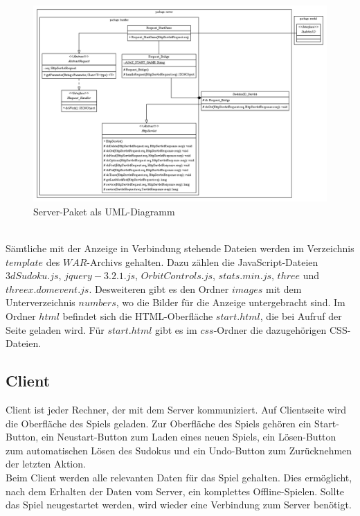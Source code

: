 \documentclass[a4paper,12pt]{scrreprt}
\begin{document}
	\begin{figure}
		\includegraphics[scale=0.55]{pictures/controller}
		\caption{Server-Paket als UML-Diagramm}
	\end{figure}\smallskip \\
	S\"amtliche mit der Anzeige in Verbindung stehende Dateien werden im Verzeichnis $template$ des
	$WAR$-Archivs gehalten. Dazu z\"ahlen die JavaScript-Dateien $3dSudoku.js$, $jquery-3.2.1.js$,
	$OrbitControls.js$, $stats.min.js$, $three$ und $threex.domevent.js$. Desweiteren gibt es den Ordner
	$images$ mit dem Unterverzeichnis $numbers$, wo die Bilder f\"ur die Anzeige untergebracht sind.
	Im Ordner $html$ befindet sich die HTML-Oberfl\"ache $start.html$, die bei Aufruf der Seite geladen wird.
	F\"ur $start.html$ gibt es im $css$-Ordner die dazugeh\"origen CSS-Dateien.\medskip \\

	\subsection{Client}
	Client ist jeder Rechner, der mit dem Server kommuniziert. Auf Clientseite wird die Oberfl\"ache des
	Spiels geladen. Zur Oberfl\"ache des Spiels geh\"oren ein Start-Button, ein Neustart-Button zum
	Laden eines neuen Spiels, ein L\"osen-Button zum automatischen L\"osen des Sudokus und ein
	Undo-Button zum Zur\"ucknehmen der letzten Aktion.\medskip \\
	Beim Client werden alle relevanten Daten f\"ur das Spiel gehalten. Dies ermöglicht, nach dem
	Erhalten der Daten vom Server, ein komplettes Offline-Spielen. Sollte das Spiel neugestartet werden,
	wird wieder eine Verbindung zum Server ben\"otigt.
\end{document}

